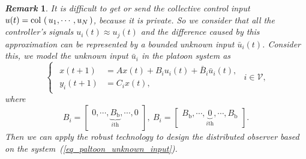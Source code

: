 \documentclass[letterpaper, 10pt, conference]{ieeeconf}  %
\def\col#1{\mathop{{\rm col}\,\left(\,#1\,\right)}}
\def\eqref#1{(\ref{#1})}
\def\V{\mathcal{V}} %
\newtheorem{remark}{\it Remark}%
\begin{document}
\begin{remark}
    It is difficult to get or send the collective control input $u(t) = \col{u_{1},\cdots , u_{N}}$, because it is private. So we consider that all the controller's signals $u_{i}(t) \approx u_{j}(t)$ and the difference caused by this approximation can be represented by a bounded unknown input $\bar{u}_{i}(t)$. Consider this, we model the unknown input $\bar{u}_{i}$ in the platoon system as 
    \begin{equation}
    \begin{cases}
        \begin{aligned}
            x(t+1) & = A x(t) + B_{i} u_{i}(t) + \bar{B}_i \bar{u}_{i}(t),\\
            y_{i}(t+1) &= C_{i} x(t),
        \end{aligned}
    \end{cases} i \in \V,
    \label{eq_paltoon_unknown_input}
\end{equation}
where 
\begin{equation*}
    B_{i} = \begin{bmatrix}
            0, \cdots , \underbrace{B_{\text{b}}}_{i\text{th}}, \cdots , 0
        \end{bmatrix}, \
    B_{i} = \begin{bmatrix}
            B_{\text{b}}, \cdots , \underbrace{0}_{i\text{th}}, \cdots , B_{\text{b}}
        \end{bmatrix}.
\end{equation*}
Then we can apply the robust technology to design the distributed observer based on the system~\eqref{eq_paltoon_unknown_input}. 
\end{remark}
\end{document}
